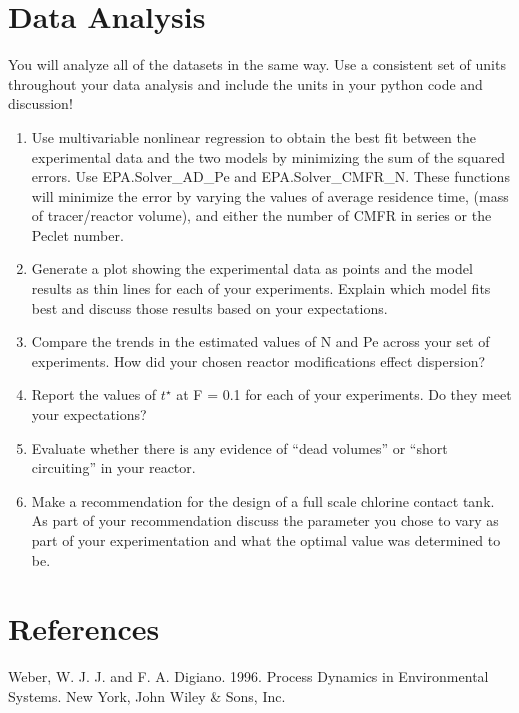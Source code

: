 \documentclass[letterpaper,10pt,english]{sphinxmanual}
\begin{document}
\section{Data Analysis}
\label{\detokenize{Reactor_Characteristics/Reactor_Characteristics:data-analysis}}\label{\detokenize{Reactor_Characteristics/Reactor_Characteristics:heading-reactor-data-analysis}}
You will analyze all of the datasets in the same way. Use a consistent set of units throughout your data analysis and include the units in your python code and discussion!
\begin{enumerate}
\item {} 
Use multivariable nonlinear regression to obtain the best fit between the experimental data and the two models by minimizing the sum of the squared errors. Use EPA.Solver\_AD\_Pe and EPA.Solver\_CMFR\_N. These functions will minimize the error by varying the values of average residence time, (mass of tracer/reactor volume), and either the number of CMFR in series or the Peclet number.

\item {} 
Generate a plot showing the experimental data as points and the model results as thin lines for each of your experiments. Explain which model fits best and discuss those results based on your expectations.

\item {} 
Compare the trends in the estimated values of N and Pe across your set of experiments. How did your chosen reactor modifications effect dispersion?

\item {} 
Report the values of \(t^{\star}\) at F = 0.1 for each of your experiments. Do they meet your expectations?

\item {} 
Evaluate whether there is any evidence of “dead volumes” or “short circuiting” in your reactor.

\item {} 
Make a recommendation for the design of a full scale chlorine contact tank. As part of your recommendation discuss the parameter you chose to vary as part of your experimentation and what the optimal value was determined to be.

\end{enumerate}


\section{References}
\label{\detokenize{Reactor_Characteristics/Reactor_Characteristics:references}}\label{\detokenize{Reactor_Characteristics/Reactor_Characteristics:heading-reactor-references}}
Weber, W. J. J. and F. A. Digiano. 1996. Process Dynamics in Environmental Systems. New York, John Wiley \& Sons, Inc.
\end{document}
